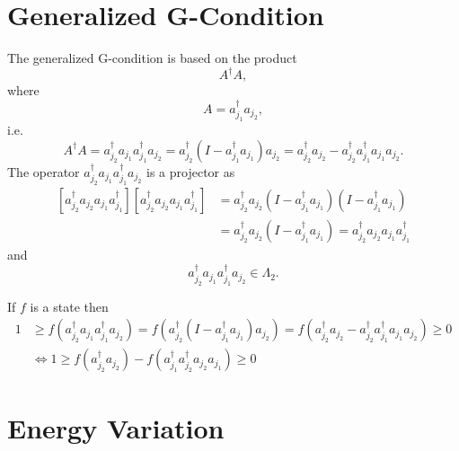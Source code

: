 \documentclass[aps,preprint]{revtex4}%
\begin{document}
\section{Generalized G-Condition}

The generalized G-condition is based on the product
\begin{equation}
A^{\dagger}A,
\end{equation}
where
\begin{equation}
A=a_{j_{1}}^{\dagger}a_{j_{2}},
\end{equation}
i.e.%
\begin{equation}
A^{\dagger}A=a_{j_{2}}^{\dagger}a_{j_{1}}a_{j_{1}}^{\dagger}a_{j_{2}}%
=a_{j_{2}}^{\dagger}\left(  I-a_{j_{1}}^{\dagger}a_{j_{1}}\right)  a_{j_{2}%
}=a_{j_{2}}^{\dagger}a_{j_{2}}-a_{j_{2}}^{\dagger}a_{j_{1}}^{\dagger}a_{j_{1}%
}a_{j_{2}}.
\end{equation}
The operator $a_{j_{2}}^{\dagger}a_{j_{1}}a_{j_{1}}^{\dagger}a_{j_{2}}$ is a
projector as
\begin{align}
\left[  a_{j_{2}}^{\dagger}a_{j_{2}}a_{j_{1}}a_{j_{1}}^{\dagger}\right]
\left[  a_{j_{2}}^{\dagger}a_{j_{2}}a_{j_{1}}a_{j_{1}}^{\dagger}\right]   &
=a_{j_{2}}^{\dagger}a_{j_{2}}\left(  I-a_{j_{1}}^{\dagger}a_{j_{1}}\right)
\left(  I-a_{j_{1}}^{\dagger}a_{j_{1}}\right) \nonumber\\
&  =a_{j_{2}}^{\dagger}a_{j_{2}}\left(  I-a_{j_{1}}^{\dagger}a_{j_{1}}\right)
=a_{j_{2}}^{\dagger}a_{j_{2}}a_{j_{1}}a_{j_{1}}^{\dagger}%
\end{align}
and
\begin{equation}
a_{j_{2}}^{\dagger}a_{j_{1}}a_{j_{1}}^{\dagger}a_{j_{2}}\in\Lambda_{2}.
\end{equation}


If $f$ is a state then%
\begin{align}
1  &  \geq f\left(  a_{j_{2}}^{\dagger}a_{j_{1}}a_{j_{1}}^{\dagger}a_{j_{2}%
}\right)  =f\left(  a_{j_{2}}^{\dagger}\left(  I-a_{j_{1}}^{\dagger}a_{j_{1}%
}\right)  a_{j_{2}}\right)  =f\left(  a_{j_{2}}^{\dagger}a_{j_{2}}-a_{j_{2}%
}^{\dagger}a_{j_{1}}^{\dagger}a_{j_{1}}a_{j_{2}}\right)  \geq0\nonumber\\
&  \Leftrightarrow1\geq f\left(  a_{j_{2}}^{\dagger}a_{j_{2}}\right)
-f\left(  a_{j_{1}}^{\dagger}a_{j_{2}}^{\dagger}a_{j_{2}}a_{j_{1}}\right)
\geq0
\end{align}


\section{Energy Variation}%
\end{document}
